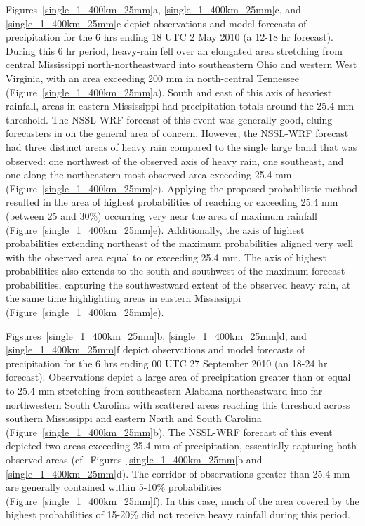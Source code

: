 \mbox{Figures \ref{single_1_400km_25mm}a}, \mbox{\ref{single_1_400km_25mm}c}, and \mbox{\ref{single_1_400km_25mm}e} depict observations and model forecasts of precipitation for the 6 hrs ending 18 UTC 2 May 2010 (a 12-18 hr forecast).
During this 6 hr period, heavy-rain fell over an elongated area stretching from central Mississippi north-northeastward into southeastern Ohio and western West Virginia, with an area exceeding 200 mm in north-central Tennessee \mbox{(Figure \ref{single_1_400km_25mm}a)}.
South and east of this axis of heaviest rainfall, areas in eastern Mississippi had precipitation totals around the 25.4 mm threshold.
The NSSL-WRF forecast of this event was generally good, cluing forecasters in on the general area of concern.
However, the NSSL-WRF forecast had three distinct areas of heavy rain compared to the single large band that was observed: one northwest of the observed axis of heavy rain, one southeast, and one along the northeastern most observed area exceeding 25.4 mm \mbox{(Figure \ref{single_1_400km_25mm}c)}.
Applying the proposed probabilistic method resulted in the area of highest probabilities of reaching or exceeding 25.4 mm (between 25 and 30\%) occurring very near the area of maximum rainfall \mbox{(Figure \ref{single_1_400km_25mm}e)}.
Additionally, the axis of highest probabilities extending northeast of the maximum probabilities aligned very well with the observed area equal to or exceeding 25.4 mm.
The axis of highest probabilities also extends to the south and southwest of the maximum forecast probabilities, capturing the southwestward extent of the observed heavy rain, at the same time highlighting areas in eastern Mississippi \mbox{(Figure \ref{single_1_400km_25mm}e)}.


\mbox{Figsures \ref{single_1_400km_25mm}b}, \mbox{\ref{single_1_400km_25mm}d}, and \mbox{\ref{single_1_400km_25mm}f} depict observations and model forecasts of precipitation for the 6 hrs ending 00 UTC 27 September 2010 (an 18-24 hr forecast).
Observations depict a large area of precipitation greater than or equal to 25.4 mm stretching from southeastern Alabama northeastward into far northwestern South Carolina with scattered areas reaching this threshold across southern Mississippi and eastern North and South Carolina \mbox{(Figure \ref{single_1_400km_25mm}b)}.
The NSSL-WRF forecast of this event depicted two areas exceeding 25.4 mm of precipitation, essentially capturing both observed areas (\mbox{cf. Figures \ref{single_1_400km_25mm}b} and \mbox{\ref{single_1_400km_25mm}d)}.
The corridor of observations greater than 25.4 mm are generally contained within 5-10\% probabilities \mbox{(Figure \ref{single_1_400km_25mm}f)}. In this case, much of the area covered by the highest probabilities of 15-20\% did not receive heavy rainfall during this period.


